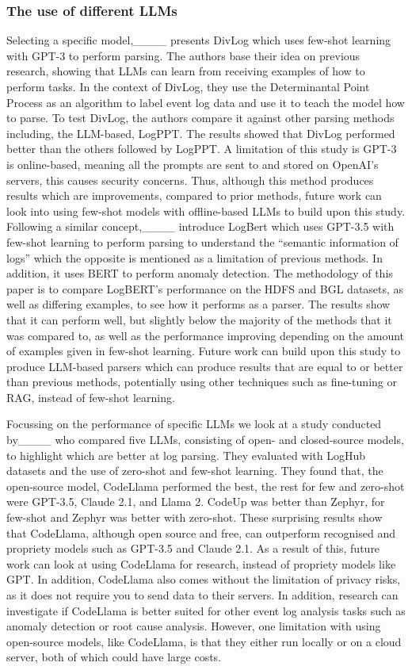 \subsubsection{The use of different LLMs}
Selecting a specific model,____ presents DivLog which uses few-shot learning with GPT-3 to perform parsing. The authors base their idea on previous research, showing that LLMs can learn from receiving examples of how to perform tasks. In the context of DivLog, they use the Determinantal Point Process as an algorithm to label event log data and use it to teach the model how to parse. To test DivLog, the authors compare it against other parsing methods including, the LLM-based, LogPPT. The results showed that DivLog performed better than the others followed by LogPPT. A limitation of this study is GPT-3 is online-based, meaning all the prompts are sent to and stored on OpenAI's servers, this causes security concerns. Thus, although this method produces results which are improvements, compared to prior methods, future work can look into using few-shot models with offline-based LLMs to build upon this study. Following a similar concept,____ introduce LogBert which uses GPT-3.5 with few-shot learning to perform parsing to understand the ``semantic information of logs'' which the opposite is mentioned as a limitation of previous methods. In addition, it uses BERT to perform anomaly detection. The methodology of this paper is to compare LogBERT's performance on the HDFS and BGL datasets, as well as differing examples, to see how it performs as a parser. The results show that it can perform well, but slightly below the majority of the methods that it was compared to, as well as the performance improving depending on the amount of examples given in few-shot learning. Future work can build upon this study to produce LLM-based parsers which can produce results that are equal to or better than previous methods, potentially using other techniques such as fine-tuning or RAG, instead of few-shot learning.

Focussing on the performance of specific LLMs we look at a study conducted by____ who compared five LLMs, consisting of open- and closed-source models, to highlight which are better at log parsing. They evaluated with LogHub datasets and the use of zero-shot and few-shot learning. They found that, the open-source model, CodeLlama performed the best, the rest for few and zero-shot were GPT-3.5, Claude 2.1, and Llama 2. CodeUp was better than Zephyr, for few-shot and Zephyr was better with zero-shot. These surprising results show that CodeLlama, although open source and free, can outperform recognised and propriety models such as GPT-3.5 and Claude 2.1. As a result of this, future work can look at using CodeLlama for research, instead of propriety models like GPT. In addition, CodeLlama also comes without the limitation of privacy risks, as it does not require you to send data to their servers. In addition, research can investigate if CodeLlama is better suited for other event log analysis tasks such as anomaly detection or root cause analysis. However, one limitation with using open-source models, like CodeLlama, is that they either run locally or on a cloud server, both of which could have large costs.

